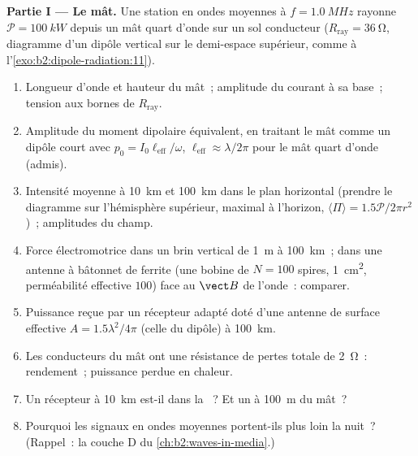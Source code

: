 \begin{problem}
\label{pb:b2:dipole-radiation:1}

\medskip
\noindent\textbf{Partie I --- Le mât.}
Une station en ondes moyennes à $f = \qty{1.0}{MHz}$ rayonne $\mathcal P = \qty{100}{kW}$
depuis un mât quart d'onde sur un sol conducteur ($R_{\text{ray}} = \qty{36}{\ohm}$,
diagramme d'un dipôle vertical sur le demi-espace supérieur, comme à
l'\cref{exo:b2:dipole-radiation:11}).
\begin{enumerate}
  \item Longueur d'onde et hauteur du mât~; amplitude du courant à sa
        base~; tension aux bornes de $R_{\text{ray}}$.
  \item Amplitude du moment dipolaire équivalent, en traitant le mât comme un
        dipôle court avec $p_0 = I_0\ell_{\text{eff}}/\omega$, $\ell_{\text{eff}} \approx
        \lambda/2\pi$ pour le mât quart d'onde (admis).
  \item Intensité moyenne à \qty{10}{km} et \qty{100}{km} dans le plan
        horizontal (prendre le diagramme sur l'hémisphère supérieur, maximal à
        l'horizon, $\langle\Pi\rangle = 1.5\mathcal P/2\pi r^2$)~; amplitudes du champ.
  \item Force électromotrice dans un brin vertical de \qty{1}{m} à \qty{100}{km}~; dans une antenne
        à bâtonnet de ferrite (une bobine de $N = 100$ spires, \qty{1}{cm^2},
        perméabilité effective $100$) face au $\vect B$ de l'onde~: comparer.
  \item Puissance reçue par un récepteur adapté doté d'une antenne de
        surface effective $A = 1.5\lambda^2/4\pi$ (celle du dipôle) à \qty{100}{km}.
  \item Les conducteurs du mât ont une résistance de pertes totale de
        \qty{2}{\ohm}~: rendement~; puissance perdue en chaleur.
  \item Un récepteur à \qty{10}{km} est-il dans la ~? Et un à
        \qty{100}{m} du mât~?
  \item Pourquoi les signaux en ondes moyennes portent-ils plus loin la nuit~? (Rappel~: la
        couche D du \cref{ch:b2:waves-in-media}.)
\end{enumerate}


\end{problem}
